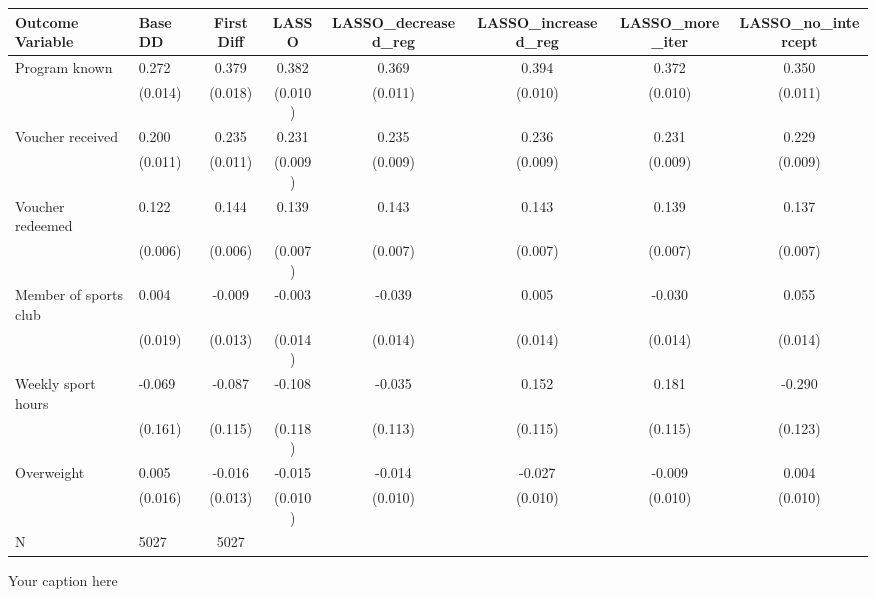 \begin{adjustbox}{angle=90}
\begin{tabular}{llcccccc}
\hline
Outcome Variable & Base DD & First Diff & LASSO & LASSO_decreased_reg & LASSO_increased_reg & LASSO_more_iter & LASSO_no_intercept \\
\hline
Program known & 0.272 & 0.379 & 0.382 & 0.369 & 0.394 & 0.372 & 0.350 \\
  & (0.014) & (0.018) & (0.010) & (0.011) & (0.010) & (0.010) & (0.011) \\
Voucher received & 0.200 & 0.235 & 0.231 & 0.235 & 0.236 & 0.231 & 0.229 \\
  & (0.011) & (0.011) & (0.009) & (0.009) & (0.009) & (0.009) & (0.009) \\
Voucher redeemed & 0.122 & 0.144 & 0.139 & 0.143 & 0.143 & 0.139 & 0.137 \\
  & (0.006) & (0.006) & (0.007) & (0.007) & (0.007) & (0.007) & (0.007) \\
Member of sports club & 0.004 & -0.009 & -0.003 & -0.039 & 0.005 & -0.030 & 0.055 \\
  & (0.019) & (0.013) & (0.014) & (0.014) & (0.014) & (0.014) & (0.014) \\
Weekly sport hours & -0.069 & -0.087 & -0.108 & -0.035 & 0.152 & 0.181 & -0.290 \\
  & (0.161) & (0.115) & (0.118) & (0.113) & (0.115) & (0.115) & (0.123) \\
Overweight & 0.005 & -0.016 & -0.015 & -0.014 & -0.027 & -0.009 & 0.004 \\
  & (0.016) & (0.013) & (0.010) & (0.010) & (0.010) & (0.010) & (0.010) \\
\hline
N & 5027 & 5027  &  &  &  &  \\
\hline
\end{tabular}
\caption{Your caption here}
\label{tab:your_label}
\end{adjustbox}